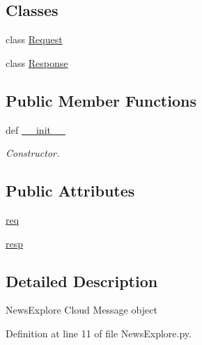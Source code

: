 \subsection*{Classes}
\begin{DoxyCompactItemize}
\item 
class \hyperlink{classRappCloud_1_1CloudMsgs_1_1NewsExplore_1_1NewsExplore_1_1Request}{Request}
\item 
class \hyperlink{classRappCloud_1_1CloudMsgs_1_1NewsExplore_1_1NewsExplore_1_1Response}{Response}
\end{DoxyCompactItemize}
\subsection*{Public Member Functions}
\begin{DoxyCompactItemize}
\item 
def \hyperlink{classRappCloud_1_1CloudMsgs_1_1NewsExplore_1_1NewsExplore_a295cadd263e71a9914464bd103481b4f}{\-\_\-\-\_\-init\-\_\-\-\_\-}
\begin{DoxyCompactList}\small\item\em Constructor. \end{DoxyCompactList}\end{DoxyCompactItemize}
\subsection*{Public Attributes}
\begin{DoxyCompactItemize}
\item 
\hyperlink{classRappCloud_1_1CloudMsgs_1_1NewsExplore_1_1NewsExplore_a37f1a4ee5dfd9a3612ae277da19fd896}{req}
\item 
\hyperlink{classRappCloud_1_1CloudMsgs_1_1NewsExplore_1_1NewsExplore_a12c7c1b315d67d7009b4c737e1a9557d}{resp}
\end{DoxyCompactItemize}


\subsection{Detailed Description}
\begin{DoxyVerb}NewsExplore Cloud Message object \end{DoxyVerb}
 

Definition at line 11 of file News\-Explore.\-py.



